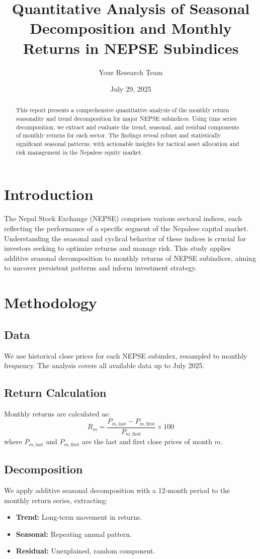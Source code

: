 \documentclass[12pt]{article}
\title{Quantitative Analysis of Seasonal Decomposition and Monthly Returns in NEPSE Subindices}
\author{Your Research Team}
\date{July 29, 2025}
\begin{document}
\maketitle
\begin{abstract}
This report presents a comprehensive quantitative analysis of the monthly return seasonality and trend decomposition for major NEPSE subindices. Using time series decomposition, we extract and evaluate the trend, seasonal, and residual components of monthly returns for each sector. The findings reveal robust and statistically significant seasonal patterns, with actionable insights for tactical asset allocation and risk management in the Nepalese equity market.
\end{abstract}
\section{Introduction}
The Nepal Stock Exchange (NEPSE) comprises various sectoral indices, each reflecting the performance of a specific segment of the Nepalese capital market. Understanding the seasonal and cyclical behavior of these indices is crucial for investors seeking to optimize returns and manage risk. This study applies additive seasonal decomposition to monthly returns of NEPSE subindices, aiming to uncover persistent patterns and inform investment strategy.
\section{Methodology}
\subsection{Data}
We use historical close prices for each NEPSE subindex, resampled to monthly frequency. The analysis covers all available data up to July 2025.
\subsection{Return Calculation}
Monthly returns are calculated as:
\[
R_{m} = \frac{P_{m, \text{last}} - P_{m, \text{first}}}{P_{m, \text{first}}} \times 100
\]
where $P_{m, \text{last}}$ and $P_{m, \text{first}}$ are the last and first close prices of month $m$.
\subsection{Decomposition}
We apply additive seasonal decomposition with a 12-month period to the monthly return series, extracting:
\begin{itemize}
    \item \textbf{Trend:} Long-term movement in returns.
    \item \textbf{Seasonal:} Repeating annual pattern.
    \item \textbf{Residual:} Unexplained, random component.
\end{itemize}
\end{document}
